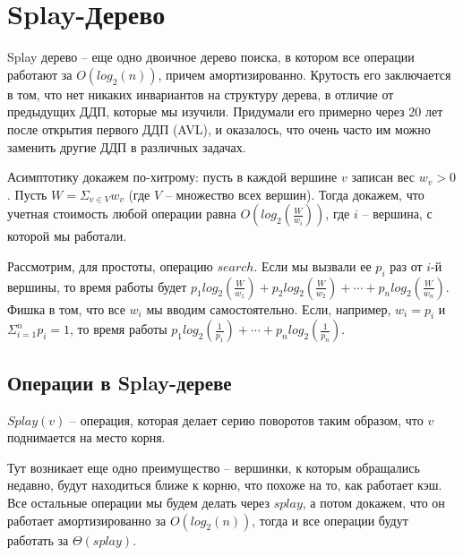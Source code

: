 \section{Splay-Дерево}



Splay дерево -- еще одно двоичное дерево поиска, в котором все операции работают за $O(log_2(n))$, причем амортизированно. Крутость его заключается в том, что нет никаких инвариантов на структуру дерева, в отличие от предыдущих ДДП, которые мы изучили. Придумали его примерно через 20 лет после открытия первого ДДП (AVL), и оказалось, что очень часто им можно заменить другие ДДП в различных задачах.

Асимптотику докажем по-хитрому: пусть в каждой вершине $v$ записан вес $w_v > 0$. Пусть $W = \Sigma_{v \in V} w_v$ (где $V$ -- множество всех вершин). Тогда докажем, что учетная стоимость любой операции равна $O(log_2(\frac{W}{w_i}))$, где $i$ -- вершина, с которой мы работали.

\begin{example}
    Рассмотрим, для простоты, операцию $search$. Если мы вызвали ее $p_i$ раз от $i$-й вершины, то время работы будет $p_1 log_2(\frac{W}{w_1}) + p_2 log_2(\frac{W}{w_2}) + \cdots + p_n log_2(\frac{W}{w_n})$. Фишка в том, что все $w_i$ мы вводим самостоятельно. Если, например, $w_i = p_i$ и $\Sigma_{i = 1}^{n} p_i = 1$, то время работы $p_1 log_2(\frac{1}{p_1}) + \cdots + p_n log_2(\frac{1}{p_n})$.
\end{example}


\subsection{Операции в Splay-дереве}


\begin{definition}
    $Splay(v)$ -- операция, которая делает серию поворотов таким образом, что $v$ поднимается на место корня.
\end{definition}

Тут возникает еще одно преимущество -- вершинки, к которым обращались недавно, будут находиться ближе к корню, что похоже на то, как работает кэш. \\
Все остальные операции мы будем делать через $splay$, а потом докажем, что он работает амортизированно за $O(log_2(n))$, тогда и все операции будут работать за $\Theta(splay)$.




